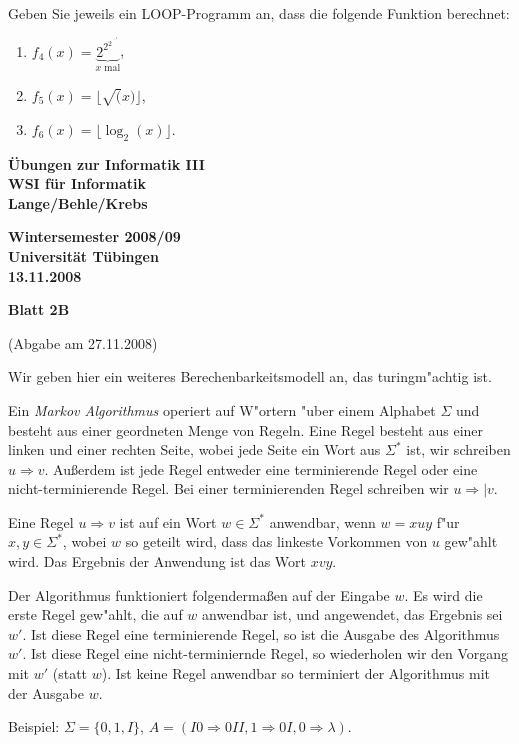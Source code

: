 \documentclass[a4paper]{article}
\def\header#1#2#3{\pagestyle{empty}
\noindent
\begin{minipage}[t]{0.6\textwidth}
\begin{flushleft}
\bf \"Ubungen zur Informatik III\\
WSI f\"ur Informatik\\
Lange/Behle/Krebs
\end{flushleft}
\end{minipage}
\begin{minipage}[t]{0.4\textwidth}
\begin{flushright}
\bf Wintersemester 2008/09\\
Universit\"at T\"ubingen\\
#2 %
\end{flushright}
\end{minipage}

\begin{center}
{\Large\bf Blatt #1}

{(Abgabe am #3)}
\end{center}
}
\begin{document}
\bigskip

\\
Geben Sie jeweils ein LOOP-Programm an, dass die folgende Funktion berechnet:
\begin{enumerate}
\item $f_4(x)=\underbrace{2^{2^{2^{\;^{\dots^2}}}}}_{x\mbox{ mal}}$,
\item $f_5(x)=\lfloor \sqrt(x)\rfloor$,
\item $f_6(x)=\lfloor \log_2(x)\rfloor$.
\end{enumerate}
\bigskip
\bigskip

\newpage
\header{2B}{13.11.2008}{27.11.2008}

\bigskip
Wir geben hier ein weiteres Berechenbarkeitsmodell an, das turingm"achtig ist.

Ein {\em Markov Algorithmus} operiert auf W"ortern "uber einem Alphabet $\Sigma$ und besteht aus einer geordneten Menge von Regeln. Eine Regel besteht aus einer linken und einer rechten Seite, wobei jede Seite ein Wort aus $\Sigma^*$ ist, wir schreiben $u\Rightarrow v$. Au\ss erdem ist jede Regel entweder eine terminierende Regel oder eine  nicht-terminierende Regel. Bei einer terminierenden Regel schreiben wir $u\Rightarrow\!\!|v$. 

Eine Regel $u\Rightarrow v$ ist auf ein Wort $w\in\Sigma^*$ anwendbar, wenn $w=xuy$ f"ur $x,y\in\Sigma^*$, wobei $w$ so geteilt wird, dass das linkeste Vorkommen von $u$ gew"ahlt wird. Das Ergebnis der Anwendung ist das Wort $xvy$. 

Der Algorithmus funktioniert folgenderma\ss en auf der Eingabe $w$. Es wird die erste Regel gew"ahlt, die auf $w$ anwendbar ist, und angewendet, das Ergebnis sei $w'$. Ist diese Regel eine terminierende Regel, so ist die Ausgabe des Algorithmus $w'$. Ist diese Regel eine nicht-terminiernde Regel, so wiederholen wir den Vorgang mit $w'$ (statt $w$). Ist keine Regel anwendbar so terminiert der Algorithmus mit der Ausgabe $w$.

Beispiel:
$\Sigma=\{0,1,I\}$, $A=(I0\Rightarrow 0II, 1\Rightarrow 0I, 0\Rightarrow\lambda)$.
\end{document}
